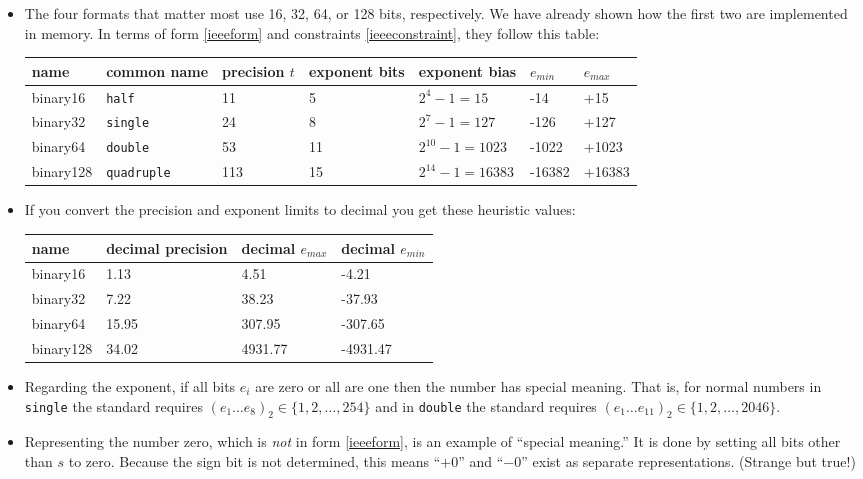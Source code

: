 \documentclass[11pt]{amsart}
\begin{document}
\begin{itemize}
\item The four formats that matter most use 16, 32, 64, or 128 bits, respectively.  We have already shown how the first two are implemented in memory.  In terms of form \eqref{ieeeform} and constraints \eqref{ieeeconstraint}, they follow this table:

\bigskip
\small
\begin{tabular}{lllllll}
name     & common name & precision $t$ & exponent bits & exponent bias & $e_{min}$ & $e_{max}$ \\ \hline
binary16 &      \texttt{half} & 11 &  5 &      $2^4-1=15$ &   -14 &   +15 \\
binary32 &    \texttt{single} & 24 &  8 &     $2^7-1=127$ &  -126 &  +127 \\
binary64 &    \texttt{double} & 53 & 11 & $2^{10}-1=1023$ & -1022 & +1023 \\
binary128 &\texttt{quadruple} &113 & 15 &$2^{14}-1=16383$ &-16382 &+16383
\end{tabular}
\normalsize
\medskip

\item If you convert the precision and exponent limits to decimal you get these heuristic values:

\bigskip
\small
\begin{tabular}{llll}
name & decimal precision & decimal $e_{max}$ & decimal $e_{min}$ \\ \hline
binary16 & 1.13 & 4.51 & -4.21 \\
binary32 & 7.22 & 38.23 & -37.93 \\
binary64 & 15.95 & 307.95 & -307.65 \\
binary128 & 34.02 & 4931.77 & -4931.47
\end{tabular}
\normalsize
\medskip

\item Regarding the exponent, if all bits $e_i$ are zero or all are one then the number has special meaning.  That is, for normal numbers in \texttt{single} the standard requires $\left(e_1\dots e_8\right)_2 \in \{1,2,\dots,254\}$ and in \texttt{double} the standard requires $\left(e_1\dots e_{11}\right)_2 \in \{1,2,\dots,2046\}$.

\item Representing the number zero, which  is \emph{not} in form \eqref{ieeeform}, is an example of ``special meaning.''  It is done by setting all bits other than $s$ to zero.  Because the sign bit is not determined, this means ``$+0$'' and ``$-0$'' exist as separate representations.  (Strange but true!)


\end{itemize}
\end{document}
